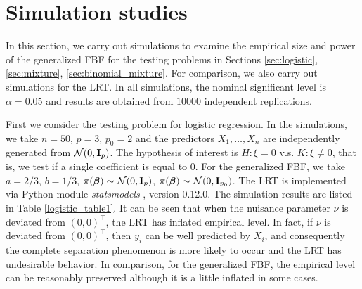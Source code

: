 \documentclass[11pt]{article}
\newcommand{\myT}{\intercal}
\newcommand{\bfsym}[1]{\ensuremath{\boldsymbol{#1}}}
\def\bbeta{\bfsym \beta}
\theoremstyle{plain}
\theoremstyle{definition}
\theoremstyle{remark}
\begin{document}
\section{Simulation studies} \label{sec:simu}
In this section, we carry out simulations to examine the empirical size and power of the generalized FBF for the testing problems in Sections \ref{sec:logistic}, \ref{sec:mixture}, \ref{sec:binomial_mixture}.
For comparison, we also carry out simulations for the LRT.
In all simulations, the nominal significant level is $\alpha = 0.05$ and results are obtained from $10000$ independent replications.

First we consider the testing problem for logistic regression.
In the simulations, we take $n = 50$, $p = 3$, $p_0 = 2$ and the predictors $X_1, \dots, X_n$ are independently generated from $\mathcal N (0, \mathbf{I}_p)$.
The hypothesis of interest is $H:\xi=0$ v.s. $K: \xi \neq 0$, that is, we test if a single coefficient is equal to $0$.
For the generalized FBF, we take $a = 2/3$, $b = 1/3$,  $\pi(\bbeta)\sim \mathcal N (0, \BI_p)$, $\pi(\bbeta) \sim \mathcal N (0, \BI_{p_0})$.
The LRT is implemented via Python module \emph{statsmodels} \cite{seabold2010statsmodels}, version 0.12.0.
The simulation results are listed in Table \ref{logistic_table1}.
It can be seen that when the nuisance parameter $\nu$ is deviated from $(0,0)^\myT$, the LRT has inflated empirical level.
In fact, if $\nu$ is deviated from $(0,0)^\myT$, then $y_i$ can be well predicted by $X_i$, and consequently the complete separation phenomenon is more likely to occur and the LRT has undesirable behavior.
In comparison, for the generalized FBF, the empirical level can be reasonably preserved although it is a little inflated in some cases.
\end{document}
